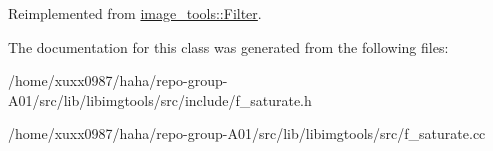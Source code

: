 Reimplemented from \hyperlink{classimage__tools_1_1Filter_afd5d1be5736e343077d331896d4130d9}{image\+\_\+tools\+::\+Filter}.



The documentation for this class was generated from the following files\+:\begin{DoxyCompactItemize}
\item 
/home/xuxx0987/haha/repo-\/group-\/\+A01/src/lib/libimgtools/src/include/f\+\_\+saturate.\+h\item 
/home/xuxx0987/haha/repo-\/group-\/\+A01/src/lib/libimgtools/src/f\+\_\+saturate.\+cc\end{DoxyCompactItemize}
